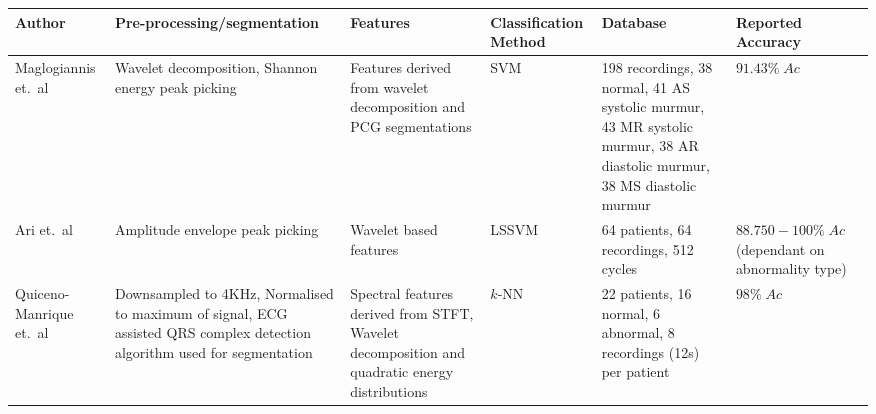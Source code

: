\documentclass[titlepage, 12pt]{scrartcl} \usepackage{enumitem}
\newcommand{\dtoprule}{\specialrule{1pt}{0pt}{1.4pt}%
            \specialrule{1pt}{0pt}{\belowrulesep}%
            }
\begin{document}
\begin{landscape}
\begin{table}[htbp]
    \label{PriorWorkTable}
\scriptsize
{}
\label{SumPrior}
\doublespacing
\begin{tabulary}{\linewidth}{LLLLLL}
\dtoprule
Author                   & Pre-processing/segmentation                                                                                                               & Features                                                                                                        & Classification Method & Database                                                                                                                 & Reported Accuracy                                  \\ \hline
Maglogiannis et.~al \citeyearpar{Maglogiannis2009}     & Wavelet decomposition, Shannon energy peak picking                                                                                        & Features derived from wavelet decomposition and PCG segmentations                                               & SVM                   & 198 recordings, 38 normal, 41 AS systolic murmur, 43 MR systolic murmur, 38 AR diastolic murmur, 38 MS diastolic murmur & $91.43\%\;Ac$                                      \\
Ari et.~al \citeyearpar{Ari2010}              & Amplitude envelope peak picking~\parencite{Ari2007}                                                                                       & Wavelet based features                                                                                          & LSSVM                 & 64 patients, 64 recordings, 512 cycles                                                                                  & $88.750-100\%\;Ac$ (dependant on abnormality type) \\
Quiceno-Manrique et.~al \citeyearpar{Quiceno-Manrique2010a}& Downsampled to 4KHz, Normalised to maximum of signal, ECG assisted QRS complex detection algorithm used for segmentation                  & Spectral features derived from STFT, Wavelet decomposition and quadratic energy distributions                   & $k$-NN                & 22 patients, 16 normal, 6 abnormal, 8 recordings (12s) per patient                                                      & $98\%\;Ac$                                         \\

\end{tabulary}
\end{table}
\end{landscape}
\end{document}
